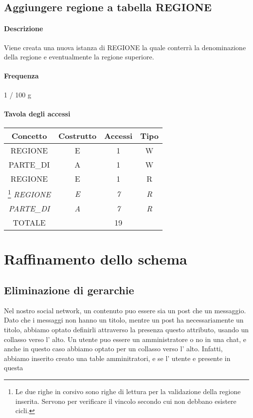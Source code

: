 \documentclass[a4paper,12pt]{report}
\begin{document}
\subsection{Aggiungere regione a tabella REGIONE} \label{aggiungere_regione}
\paragraph{Descrizione} Viene creata una nuova istanza di REGIONE la quale conterrà la denominazione della regione e eventualmente la regione superiore.
\paragraph{Frequenza} 1 / 100 g
\begin{table}[H]
\paragraph{Tavola degli accessi\newline}
\begin{tabular}{|c|c|c|c|}
\hline
Concetto           & Costrutto  & Accessi    & Tipo       \\ \hline
REGIONE            & E          & 1          & W          \\ \hline
PARTE\_DI          & A          & 1          & W          \\ \hline
REGIONE            & E          & 1          & R          \\ \hline
\footnote{Le due righe in corsivo sono righe di lettura per la validazione della regione inserita. Servono per verificare il vincolo secondo cui non debbano esistere cicli.}
\textit{REGIONE}   & \textit{E} & \textit{7} & \textit{R} \\ \hline
\textit{PARTE\_DI} & \textit{A} & \textit{7} & \textit{R} \\ \hline
TOTALE             &            & 19         &            \\ \hline
\end{tabular}
\end{table}
\section{Raffinamento dello schema}
\subsection{Eliminazione di gerarchie}
Nel nostro social network, un contenuto puo essere sia un 
post che un messaggio. Dato che i messaggi non hanno un titolo, mentre un post ha necessariamente un titolo, 
abbiamo optato definirli attraverso la presenza questo attributo, usando un collasso verso l' alto.
Un utente puo essere un amministratore o no in una chat, e anche in questo caso abbiamo optato per un collasso verso 
l' alto. Infatti, abbiamo inserito creato una table amminitratori, e se l' utente e presente in questa 
\end{document}
